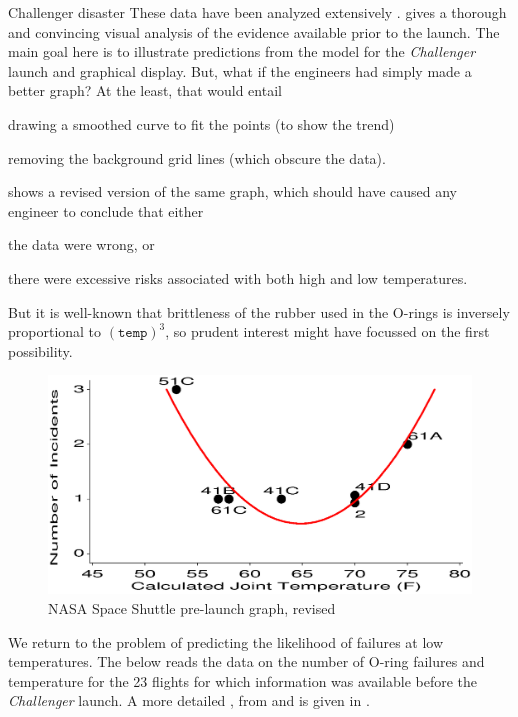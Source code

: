 \begin{Example}[nasa]{Challenger disaster}
These data have been analyzed extensively
\citep{Dalal-etal:89,Lavine:91}.
\citet{Tufte:97} gives a thorough and convincing
visual analysis of the evidence available prior to the launch.
The main goal here is to
illustrate predictions from the model for the \emph{Challenger} launch
and graphical display.
But, what if the engineers had simply made a better graph?
At the least, that would entail
\begin{seriate}
\item drawing a smoothed curve to fit the points (to show the trend)
\item removing the background grid lines (which obscure the data).
\end{seriate}
shows a revised version of the same 
graph, which should have caused any engineer to conclude that
either 
\begin{seriate}
\item the data were wrong, or
\item there were excessive risks
associated with both high and low temperatures.
\end{seriate}
But it is well-known
that brittleness of the rubber used in the O-rings is inversely
proportional to $(\texttt{temp})^3$, so prudent interest might have focussed
on the first possibility.

\begin{figure}[htb]
  \centering
  \includegraphics[clip,width=\textwidth]{ch6/fig/nasa02}
  \caption{NASA Space Shuttle pre-launch graph, revised}\label{fig:nasa02}
\end{figure}

We return to the problem of predicting the likelihood of failures at
low temperatures.
The \Dstp{} below reads the data on the number of O-ring failures
and temperature for the 23 flights for which information was available
before the \emph{Challenger} launch.  A more detailed \Dset,
from \citet{Dalal-etal:89} and \citet{Tufte:97} is given in .


\end{Example}

